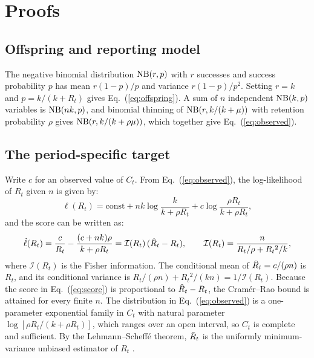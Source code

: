 \clearpage
\appendix
{}
\renewcommand{\theequation}{\thesection.\arabic{equation}}

\section{Proofs}
\label{app:proofs}

\subsection{Offspring and reporting model}
\label{app:model}

The negative binomial distribution $\mathrm{NB}(r,p)$ with $r$ successes and success probability $p$ has mean $r(1-p)/p$ and variance $r(1-p)/p^2$. Setting $r=k$ and $p=k/(k+R_t)$ gives Eq.~(\ref{eq:offspring}). A sum of $n$ independent $\mathrm{NB}(k,p)$ variables is $\mathrm{NB}(nk,p)$, and binomial thinning of $\mathrm{NB}(r,k/(k+\mu))$ with retention probability $\rho$ gives $\mathrm{NB}(r,k/(k+\rho\mu))$, which together give Eq.~(\ref{eq:observed}).

\subsection{The period-specific target}
\label{app:target1}

Write $c$ for an observed value of $C_t$. From Eq.~(\ref{eq:observed}), the log-likelihood of $R_t$ given $n$ is given by:
\begin{equation}
  \ell(R_t)=\text{const}+nk\log\frac{k}{k+\rho R_t}+c\log\frac{\rho R_t}{k+\rho R_t},
\end{equation}
and the score can be written as:
\begin{equation}
  \dot{\ell}(R_t)=\frac{c}{R_t}-\frac{(c+nk)\rho}{k+\rho R_t}=\mathcal{I}(R_t)\,(\Rhat_t-R_t),\qquad
  \mathcal{I}(R_t)=\frac{n}{R_t/\rho+R_t{}^2/k},
  \label{eq:score}
\end{equation}
where $\mathcal{I}(R_t)$ is the Fisher information. The conditional mean of $\Rhat_t=c/(\rho n)$ is $R_t$, and its conditional variance is $R_t/(\rho n)+R_t{}^2/(kn)=1/\mathcal{I}(R_t)$. Because the score in Eq.~(\ref{eq:score}) is proportional to $\Rhat_t-R_t$, the Cram\'er--Rao bound is attained for every finite $n$. The distribution in Eq.~(\ref{eq:observed}) is a one-parameter exponential family in $C_t$ with natural parameter $\log[\rho R_t/(k+\rho R_t)]$, which ranges over an open interval, so $C_t$ is complete and sufficient. By the Lehmann--Scheff\'e theorem, $\Rhat_t$ is the uniformly minimum-variance unbiased estimator of $R_t$ \citep{lehmann1998theory, lehmann2005testing}.

